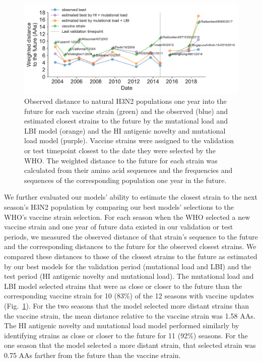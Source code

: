 \begin{figure}[htb]
  \begin{center}
  \includegraphics[width=\textwidth]{figures/vaccine-comparison.pdf}
  \caption{
    Observed distance to natural H3N2 populations one year into the future for each vaccine strain (green) and the observed (blue) and estimated closest strains to the future by the mutational load and LBI model (orange) and the HI antigenic novelty and mutational load model (purple).
    Vaccine strains were assigned to the validation or test timepoint closest to the date they were selected by the WHO.
    The weighted distance to the future for each strain was calculated from their amino acid sequences and the frequencies and sequences of the corresponding population one year in the future.
  }
  \label{fig:vaccine_comparison}
  \end{center}
\end{figure}

We further evaluated our models' ability to estimate the closest strain to the next season's H3N2 population by comparing our best models' selections to the WHO's vaccine strain selection.
For each season when the WHO selected a new vaccine strain and one year of future data existed in our validation or test periods, we measured the observed distance of that strain's sequence to the future and the corresponding distances to the future for the observed closest strains.
We compared these distances to those of the closest strains to the future as estimated by our best models for the validation period (mutational load and LBI) and the test period (HI antigenic novelty and mutational load).
The mutational load and LBI model selected strains that were as close or closer to the future than the corresponding vaccine strain for 10 (83\%) of the 12 seasons with vaccine updates (Fig.~\ref{fig:vaccine_comparison}).
For the two seasons that the model selected more distant strains than the vaccine strain, the mean distance relative to the vaccine strain was 1.58 AAs.
The HI antigenic novelty and mutational load model performed similarly by identifying strains as close or closer to the future for 11 (92\%) seasons.
For the one season that the model selected a more distant strain, that selected strain was 0.75 AAs farther from the future than the vaccine strain.

